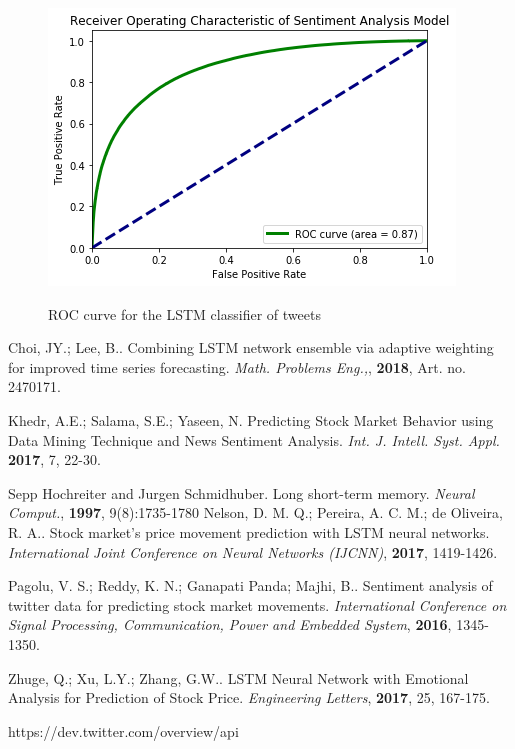 \documentclass[conference]{IEEEtran}
\begin{document}
\begin{minipage}{\linewidth}
\begin{figure}[H]
\centering
\caption{ROC curve for the LSTM classifier of tweets} 
\includegraphics[scale=0.4]{Graphs/ROCCurveSentiment.png}
\label{ROC Sentiment} 
\end{figure}
\end{minipage}


\begin{thebibliography}{2}
 Choi, JY.; Lee, B.. Combining LSTM network ensemble via adaptive weighting for improved time series forecasting. \textit{Math. Problems Eng.,}, \textbf{2018}, Art. no. 2470171.

 Khedr, A.E.; Salama, S.E.; Yaseen, N. Predicting Stock Market Behavior using Data Mining Technique and News Sentiment Analysis. \textit{Int. J. Intell. Syst. Appl.} \textbf{2017}, 7, 22-30.

 Sepp Hochreiter and Jurgen Schmidhuber. Long short-term memory. \textit{Neural Comput.}, \textbf{1997}, 9(8):1735-1780
 Nelson, D. M. Q.; Pereira, A. C. M.; de Oliveira, R. A.. Stock market’s price movement
prediction with LSTM neural networks. \textit{International Joint Conference on Neural Networks (IJCNN)}, \textbf{2017}, 1419-1426.

 Pagolu, V. S.; Reddy, K. N.; Ganapati Panda; Majhi, B.. Sentiment
analysis of twitter data for predicting stock market
movements. \textit{International
Conference on Signal Processing, Communication,
Power and Embedded System}, \textbf{2016}, 1345-1350.

 Zhuge, Q.; Xu, L.Y.; Zhang, G.W..  LSTM Neural Network with Emotional
Analysis for Prediction of Stock Price. \textit{Engineering Letters}, \textbf{2017}, 25, 167-175.

 https://dev.twitter.com/overview/api
\end{thebibliography}
\end{document}
